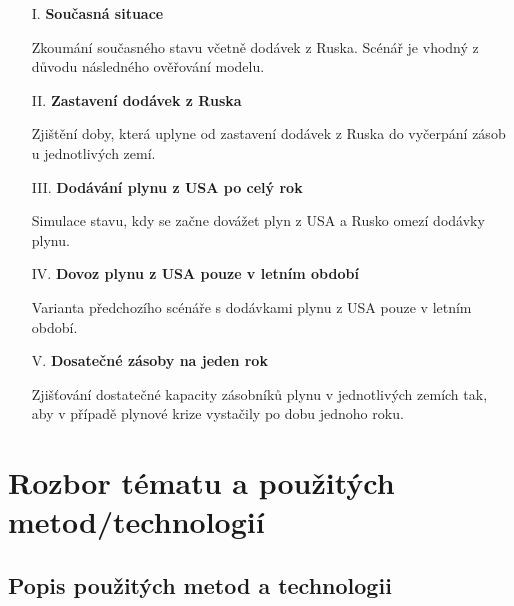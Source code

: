 \documentclass[a4paper,11pt]{article}
\begin{document}
\begin{enumerate}
\item[I.] \textbf{Současná situace}

Zkoumání současného stavu včetně dodávek z Ruska.
Scénář je vhodný z důvodu následného ověřování modelu.

\item[II.] \textbf{Zastavení dodávek z Ruska}

Zjištění doby, která uplyne od zastavení dodávek z Ruska do vyčerpání zásob u jednotlivých zemí.

\item[III.] \textbf{Dodávání plynu z USA po celý rok}

Simulace stavu, kdy se začne dovážet plyn z USA a Rusko omezí dodávky plynu.

\item[IV.] \textbf{Dovoz plynu z USA pouze v letním období}

Varianta předchozího scénáře s dodávkami plynu z USA pouze v letním období.

\item[V.] \textbf{Dosatečné zásoby na jeden rok}

Zjišťování dostatečné kapacity zásobníků plynu v jednotlivých zemích
tak, aby v případě plynové krize vystačily po dobu jednoho roku.
\end{enumerate}

\section{Rozbor tématu a použitých metod/technologií}




\subsection{Popis použitých metod a technologii}
\end{document}
